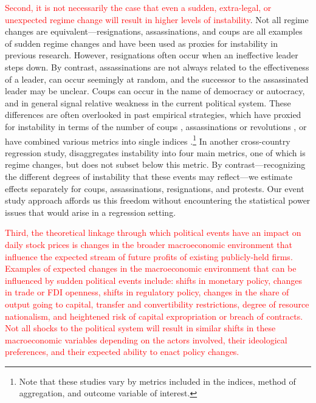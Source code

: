 \documentclass[12pt,final,fleqn]{article}
\theoremstyle{plain}
\begin{document}
\textcolor{red}{Second, it is not necessarily the case that even a sudden, extra-legal, or unexpected regime change will result in higher levels of instability}. Not all regime changes are equivalent---resignations, assassinations, and coups are all examples of sudden regime changes and have been used as proxies for instability in previous research. However, resignations often occur when an ineffective leader steps down. By contrast, assassinations are not always related to the effectiveness of a leader, can occur seemingly at random, and the successor to the assassinated leader may be unclear. Coups can occur in the name of democracy or autocracy, and in general signal relative weakness in the current political system. These differences are often overlooked in past empirical strategies, which have proxied for instability in terms of the number of coups \citep{londregan1990poverty, alesina1996political}, assassinations or revolutions \citep{barro1991economic}, or have combined various metrics into single indices \citep{alesina1996income, venieris1986income, gupta1990economics}.\footnote{Note that these studies vary by metrics included in the indices, method of aggregation, and outcome variable of interest.} In another cross-country regression study, \citet{jong2009measurement} disaggregates instability into four main metrics, one of which is regime changes, but does not subset below this metric. By contrast---recognizing the different degrees of instability that these events may reflect---we estimate effects separately for coups, assassinations, resignations, and protests. Our event study approach affords us this freedom without encountering the statistical power issues that would arise in a regression setting.

\textcolor{red}{Third, the theoretical linkage through which political events have an impact on daily stock prices is changes in the broader macroeconomic environment that influence the expected stream of future profits of existing publicly-held firms. Examples of expected changes in the macroeconomic environment that can be influenced by sudden political events include: shifts in monetary policy, changes in trade or FDI openness, shifts in regulatory policy, changes in the share of output going to capital, transfer and convertibility restrictions, degree of resource nationalism, and heightened risk of capital expropriation or breach of contracts. Not all shocks to the political system will result in similar shifts in these macroeconomic variables depending on the actors involved, their ideological preferences, and their expected ability to enact policy changes.}
\end{document}
